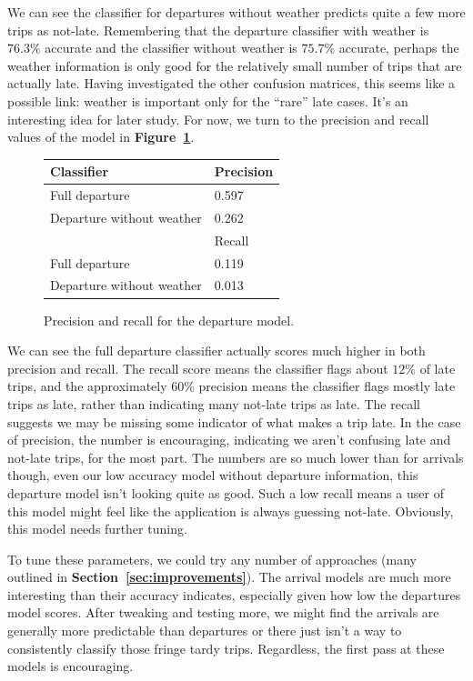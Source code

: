 \documentclass[11pt]{article} %
\begin{document}
We can see the classifier for departures without weather predicts quite 
a few more trips 
as not-late. Remembering that the departure classifier with weather is $76.3\%$ 
accurate and the classifier without weather is $75.7\%$ accurate, perhaps the
weather information is only good for the relatively small number of trips that 
are actually late. Having investigated the other confusion matrices, this seems
like a possible link: weather is important only for the ``rare'' late cases. 
It's an interesting idea for later study. For now, we turn to the precision and
recall values of the model in \textbf{Figure~\ref{fig:pr_departures}}.

\begin{figure}
    \begin{tabular}{l|l}
         Classifier & Precision\\
         \hline
         Full departure & 0.597\\
         Departure without weather & 0.262\\
         \hline
         & Recall\\
         \hline
         Full departure & 0.119\\
         Departure without weather & 0.013\\
    \end{tabular}
    \caption{Precision and recall for the departure model.}
    \label{fig:pr_departures}
\end{figure}

We can see the full departure classifier actually scores much higher in
both precision and recall. The recall score means the classifier flags about 
$12\%$ of late trips, and the approximately $60\%$ precision means the classifier
flags mostly late trips as late, rather than indicating many not-late trips
as late. The recall suggests we may be missing some indicator of what makes a 
trip late. In the case of precision, the number is encouraging, indicating we 
aren't confusing late and not-late trips, for the most part. The numbers are so
much lower than for arrivals though, even our low accuracy model without departure
information, this departure model isn't looking quite as good. Such a low 
recall means a user of this model might feel like the application is always 
guessing not-late. Obviously, this model needs further tuning.

To tune these parameters, we could try any number of approaches (many outlined in
\textbf{Section~\ref{sec:improvements}}). The arrival models are much more 
interesting than their accuracy indicates, especially given how low the 
departures model scores. After tweaking and testing more, we might find the
arrivals are generally more predictable than departures or there just isn't
a way to consistently classify those fringe tardy trips. Regardless, the first
pass at these models is encouraging.
\end{document}
